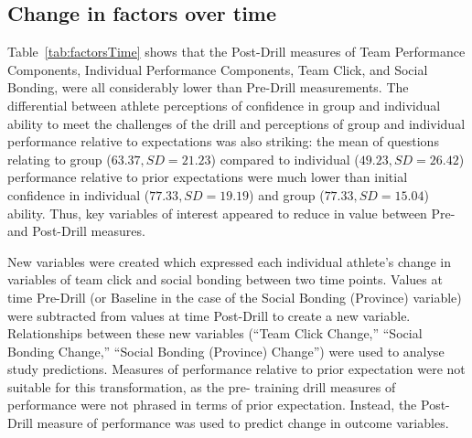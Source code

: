 \begin{CJK}{UTF8}{gbsn}



\subsection{Change in factors over time}
Table~\ref{tab:factorsTime} shows that the Post-Drill measures of Team Performance Components, Individual Performance Components, Team Click, and Social Bonding, were all considerably lower than Pre-Drill measurements. The differential between athlete perceptions of confidence in group and individual ability to meet the challenges of the drill and perceptions of group and individual performance relative to expectations was also striking: the mean of questions relating to group ($63.37, SD = 21.23$) compared to individual ($49.23, SD = 26.42$) performance relative to prior expectations were much lower than initial confidence in individual ($77.33, SD = 19.19$) and group ($77.33, SD = 15.04$) ability.  Thus, key variables of interest appeared to reduce in value between Pre- and Post-Drill measures.



New variables were created which expressed each individual athlete's change in variables of team click and social bonding between two time points.  Values at time Pre-Drill (or Baseline in the case of the Social Bonding (Province) variable) were subtracted from values at time Post-Drill to create a new variable.  Relationships between these new variables (``Team Click Change,'' ``Social Bonding Change,'' ``Social Bonding (Province) Change'') were used to analyse study predictions. Measures of performance relative to prior expectation were not suitable for this transformation, as the pre- training drill measures of performance were not phrased in terms of prior expectation.  Instead, the Post-Drill measure of performance was used to predict change in outcome variables.


\end{CJK}
